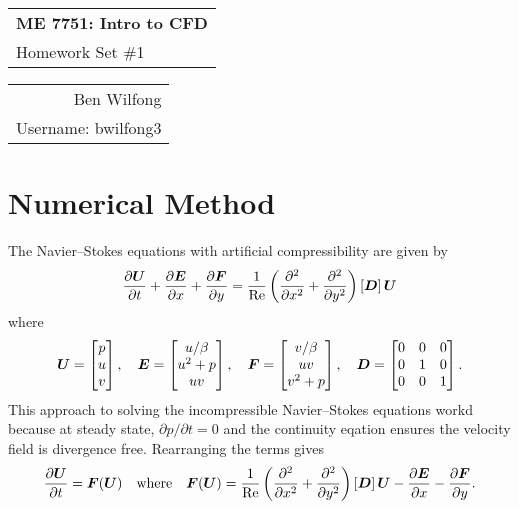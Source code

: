 \documentclass[reqno]{amsart}
\def\name{Ben Wilfong} %
\def\ID{bwilfong3} %
\begin{document}
	\noindent
	\thispagestyle{firststyle}
	\begin{tabular}{l}
		{\LARGE \textbf{ME 7751: Intro to CFD} }\\
		{\Large Homework Set \#1}
	\end{tabular} \hfill \begin{tabular}{r}
		\name \\
		Username: \ID
	\end{tabular}
	\noindent\makebox[\linewidth]{\rule{\textwidth}{1pt}}

    \section{Numerical Method}
    \noindent The Navier--Stokes equations with artificial compressibility are given by
    \begin{equation*}
        \pdiff[\bU]{t} + \pdiff[\bE]{x} + \pdiff[\bF]{y} =
        \frac{1}{\mathrm{Re}}\left(\pdifftwo{x} + \pdifftwo{y}\right)\left[\bD\right]\bU
    \end{equation*}
    where
    \begin{equation*}
        \bm{U} = \begin{bmatrix} p \\ u \\ v \end{bmatrix}, \quad
        \bm{E} = \begin{bmatrix} u/\beta \\ u^2 + p \\ uv \end{bmatrix}, \quad
        \bm{F} = \begin{bmatrix} v/\beta \\ uv \\ v^2 + p \\ \end{bmatrix}, \quad
        \bm{D} = \begin{bmatrix} 0 & 0 & 0 \\ 0 & 1 & 0 \\ 0 & 0 & 1 \end{bmatrix}.
    \end{equation*}
    This approach to solving the incompressible Navier--Stokes equations workd because at steady state, $\partial p/\partial t = 0$ and the continuity eqation ensures the velocity field is divergence free.
    Rearranging the terms gives
    \begin{equation*}
        \pdiff[\bU]{t} = \bm{F}(\bU) \quad \text{where} \quad \bm{F}(\bU) =
        \frac{1}{\mathrm{Re}}\left(\pdifftwo{x} + \pdifftwo{y}\right)\left[\bD\right]\bU
        - \pdiff[\bE]{x} - \pdiff[\bF]{y}.
    \end{equation*}
\end{document}
